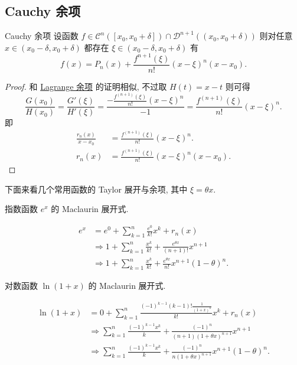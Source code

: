 \documentclass[cn,toc=twocol]{elegantbook}
\newcommand{\D}{\mathscr{D}}
\begin{document}
\subsection{Cauchy 余项}

\begin{theorem}{Cauchy 余项}
	设函数 $f \in \mathscr{C}^n([x_0,x_0+\delta]) \cap \D^{n+1}((x_0,x_0+\delta))$ 则对任意 $x \in (x_0-\delta,x_0+\delta)$ 都存在 $\xi \in (x_0-\delta,x_0+\delta)$ 有
	\[
		f(x) = P_n(x) + \frac{f^{n+1}(\xi)}{n!} (x-\xi)^{n}(x-x_0).
	\]
\end{theorem}
\begin{proof}
和 \hyperref[thm:lagrangeR]{	Lagrange 余项} 的证明相似, 不过取 $H(t) = x - t$ 则可得
\[
	\frac{G(x_0)}{H(x_0)} = \frac{G'(\xi)}{H'(\xi)} = \frac{-\frac{f^{(n+1)}(\xi)}{n!}(x-\xi)^n}{-1} = \frac{f^{(n+1)}(\xi)}{n!}(x-\xi)^n.
\]
即
\[
\begin{aligned}
	\frac{r_n(x)}{x - x_0} &= \frac{f^{(n+1)}(\xi)}{n!}(x-\xi)^n.\\
		r_n(x) &= \frac{f^{(n+1)}(\xi)}{n!}(x - \xi)^{n}(x - x_0).
\end{aligned}
\]
\end{proof}

下面来看几个常用函数的 Taylor 展开与余项, 其中 $\xi = \theta x$.

\begin{example}
	指数函数 $e^x$ 的 Maclaurin 展开式.
\end{example}

\begin{solution}
\[
	\begin{aligned}
		e^x &= e^0 + \sum_{k = 1}^n \frac{e^0}{k!} x^k + r_n(x)\\
		&\Rightarrow 1 + \sum_{k = 1}^n \frac{x^k}{k!} +  \frac{e^{\theta x}}{(n+1)!}x^{n+1}\\
		&\Rightarrow 1 + \sum_{k = 1}^n \frac{x^k}{k!} +  \frac{e^{\theta x}}{n!}x^{n+1}(1-\theta)^n.
	\end{aligned}
\]
\end{solution}
\vspace{0.5em}

\begin{example}
	对数函数 $\ln(1+x)$ 的 Maclaurin 展开式.
\end{example}

\begin{solution}
\[
	\begin{aligned}
		\ln(1+x) &= 0 + \sum_{k = 1}^n \frac{(-1)^{k-1}(k-1)!\frac{1}{(1+x)^k}}{k!} x^k + r_n(x)\\
		&\Rightarrow \sum_{k = 1}^n \frac{(-1)^{k-1}x^k}{k} + \frac{(-1)^{n}}{(n+1)(1+\theta x)^{n+1}}x^{n+1}\\
		&\Rightarrow \sum_{k = 1}^n \frac{(-1)^{k-1}x^k}{k} + \frac{(-1)^{n}}{n(1+\theta x)^{n+1}}x^{n+1}(1-\theta)^n.
	\end{aligned}
\]
\end{solution}
\vspace{0.5em}
\end{document}
